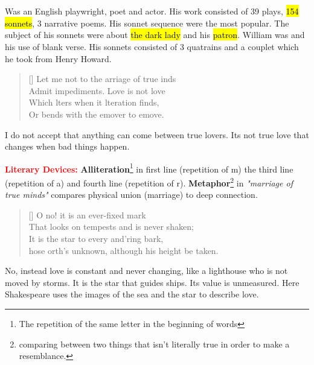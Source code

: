 \documentclass[12pt, a4paper]{article}
\begin{document}
  
\section*{}
Was an English playwright, poet and actor. His work consisted
of 39 plays, \hl{154 sonnets}, 3 narrative poems. His sonnet sequence were
the most popular. The subject of his sonnets were about \hl{the dark lady} and his \hl{patron}.
William was  and his use of blank verse. His 
sonnets consisted of 3 quatrains and a couplet which he 
took from Henry Howard.


\settowidth{\versewidth}{let me not to the marriage of true minds}
\begin{verse}[\versewidth]
{\fontverse
Let me not to the arriage of true inds\\
Admit impediments. Love is not love \\
Which lters when it lteration finds,\\ 
Or bends with the emover to emove.
}
\end{verse}
I do not accept that anything can come between 
true lovers. Its not true love that changes when bad things
happen.\medbreak

\textbf{\textcolor{red}{Literary Devices:}} \textbf{Alliteration}\footnote{
The repetition of the same letter in the beginning of words} 
in first line (repetition of m) the third line (repetition of a) and 
fourth line (repetition of r).  \textbf{Metaphor}\footnote{ comparing between
two things that isn't literally true in order to make a resemblance.}  
in \textit{"marriage of true minds"} compares physical union 
(marriage) to deep connection.

\begin{verse}[\versewidth]
{\fontverse
O no! it is an ever-fixed mark\\
That looks on tempests and is never shaken;\\
It is the star to every and'ring bark,\\
hose orth's unknown, although his height be taken.
}
\end{verse}
No, instead love is constant and never changing,
like a lighthouse who is not moved by storms.
It is the star that guides ships. Its value 
is unmeasured. Here Shakespeare uses the images of the 
sea and the star to describe love.\medbreak
\end{document}
